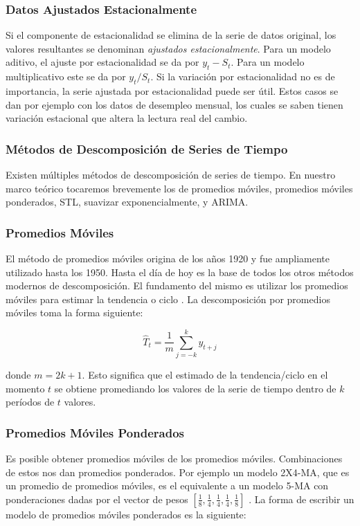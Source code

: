 \subsubsection{Datos Ajustados Estacionalmente}
Si el componente de estacionalidad se elimina de la serie de datos original, los valores resultantes se denominan \emph{ajustados estacionalmente}. Para un modelo aditivo, el ajuste por estacionalidad se da por $y_t - S_t$. Para un modelo multiplicativo este se da por $y_t/S_t$. Si la variación por estacionalidad no es de importancia, la serie ajustada por estacionalidad puede ser útil. Estos casos se dan por ejemplo con los datos de desempleo mensual, los cuales se saben tienen variación estacional que altera la lectura real del cambio. 

\subsubsection{Métodos de Descomposición de Series de Tiempo}
Existen múltiples métodos de descomposición de series de tiempo. En nuestro marco teórico tocaremos brevemente los de promedios móviles, promedios móviles ponderados, STL, suavizar exponencialmente, y ARIMA.

\subsubsection{Promedios Móviles}

El método de promedios móviles origina de los años 1920 y fue ampliamente utilizado hasta los 1950. Hasta el día de hoy es la base de todos los otros métodos modernos de descomposición. El fundamento del mismo es utilizar los promedios móviles para estimar la tendencia o ciclo \cite{hyndman}. La descomposición por promedios móviles toma la forma siguiente:

\[ \hat{T}_{t} = \frac{1}{m} \sum_{j = -k}^{k} y_{t + j}  \]

donde $m=2k+1$. Esto significa que el estimado de la tendencia/ciclo en el momento $t$ se obtiene promediando los valores de la serie de tiempo dentro de $k$ períodos de $t$ valores. 

\subsubsection{Promedios Móviles Ponderados}
Es posible obtener promedios móviles de los promedios móviles. Combinaciones de estos nos dan promedios ponderados. Por ejemplo un modelo 2X4-MA, que es un promedio de promedios móviles, es el equivalente a un modelo 5-MA con ponderaciones dadas por el vector de pesos $[\frac{1}{8}, \frac{1}{4}, \frac{1}{4}, \frac{1}{4}, \frac{1}{8}]$ \cite{hyndman}. La forma de escribir un modelo de promedios móviles ponderados es la siguiente:

